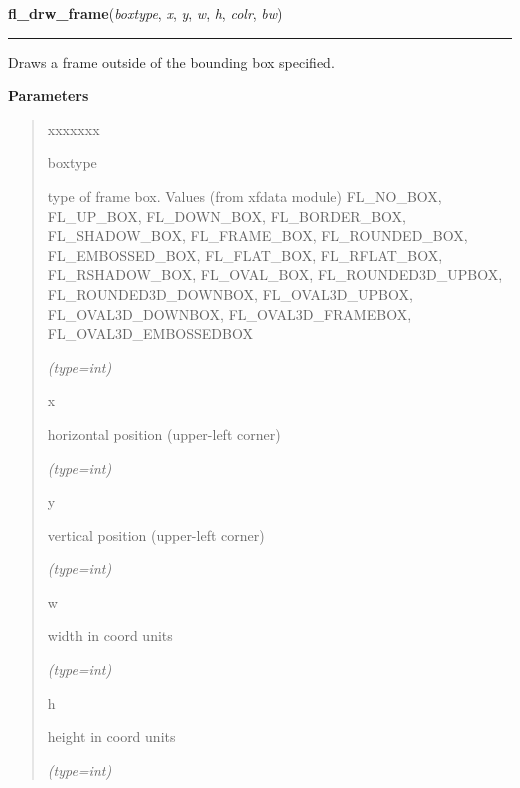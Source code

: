 \hspace{.8\funcindent}\begin{boxedminipage}{\funcwidth}

    \raggedright \textbf{fl\_drw\_frame}(\textit{boxtype}, \textit{x}, \textit{y}, \textit{w}, \textit{h}, \textit{colr}, \textit{bw})

    \vspace{-1.5ex}

    \rule{\textwidth}{0.5\fboxrule}
\setlength{\parskip}{2ex}
    Draws a frame outside of the bounding box specified.

\setlength{\parskip}{1ex}
      \textbf{Parameters}
      \vspace{-1ex}

      \begin{quote}
        \begin{Ventry}{xxxxxxx}

          \item[boxtype]

          type of frame box. Values (from xfdata module) FL\_NO\_BOX, 
          FL\_UP\_BOX, FL\_DOWN\_BOX, FL\_BORDER\_BOX, FL\_SHADOW\_BOX, 
          FL\_FRAME\_BOX, FL\_ROUNDED\_BOX, FL\_EMBOSSED\_BOX, 
          FL\_FLAT\_BOX, FL\_RFLAT\_BOX, FL\_RSHADOW\_BOX, FL\_OVAL\_BOX, 
          FL\_ROUNDED3D\_UPBOX, FL\_ROUNDED3D\_DOWNBOX, FL\_OVAL3D\_UPBOX, 
          FL\_OVAL3D\_DOWNBOX, FL\_OVAL3D\_FRAMEBOX, 
          FL\_OVAL3D\_EMBOSSEDBOX

            {\it (type=int)}

          \item[x]

          horizontal position (upper-left corner)

            {\it (type=int)}

          \item[y]

          vertical position (upper-left corner)

            {\it (type=int)}

          \item[w]

          width in coord units

            {\it (type=int)}

          \item[h]

          height in coord units

            {\it (type=int)}


\end{Ventry}
\end{quote}
\end{boxedminipage}
